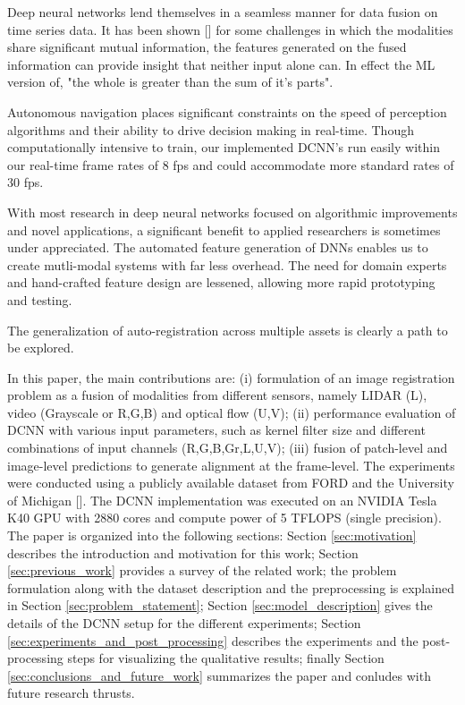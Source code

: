 \documentclass{article}
\begin{document}
Deep neural networks lend themselves in a seamless manner for data fusion on time series data. It has been shown [\cite{Ngiam2011Multimodal}] for some challenges in which the modalities share significant mutual information, the features generated on the fused information can provide insight that neither input alone can. In effect the ML version of, "the whole is greater than the sum of it's parts". 

Autonomous navigation places significant constraints on the speed of perception algorithms and their ability to drive decision making in real-time. Though computationally intensive to train, our implemented DCNN's run easily within our real-time frame rates of 8 fps and could accommodate more standard rates of 30 fps. %

With most research in deep neural networks focused on algorithmic improvements and novel applications, a significant benefit to applied researchers is sometimes under appreciated. The automated feature generation of DNNs enables us to create mutli-modal systems with far less overhead. The need for domain experts and hand-crafted feature design are lessened, allowing more rapid prototyping and testing. 

The generalization of auto-registration across multiple assets is clearly a path to be explored. 

In this paper, the main contributions are: (i) formulation of an image registration problem as a fusion of modalities from different sensors, namely LIDAR (L), video (Grayscale or R,G,B) and optical flow (U,V); (ii) performance evaluation of DCNN with various input parameters, such as kernel filter size and different combinations of input channels (R,G,B,Gr,L,U,V); (iii) fusion of patch-level and image-level predictions to generate alignment at the frame-level. The experiments were conducted using a publicly available dataset from FORD and the University of Michigan [\cite{Pandey2011Ford-Campu}]. The DCNN implementation was executed on an NVIDIA Tesla K40 GPU with 2880 cores and compute power of 5 TFLOPS (single precision). The paper is organized into the following sections: Section \ref{sec:motivation} describes the introduction and motivation for this work; Section \ref{sec:previous_work} provides a survey of the related work; the problem formulation along with the dataset description and the preprocessing is explained in Section \ref{sec:problem_statement}; Section \ref{sec:model_description} gives the details of the DCNN setup for the different experiments; Section \ref{sec:experiments_and_post_processing} describes the experiments and the post-processing steps for visualizing the qualitative results; finally Section \ref{sec:conclusions_and_future_work} summarizes the paper and conludes with future research thrusts.
\end{document}
